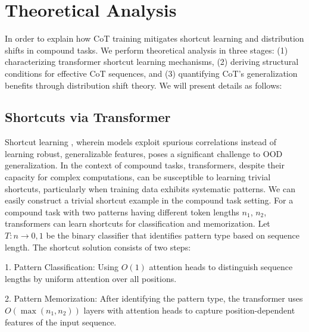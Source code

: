 \section{Theoretical Analysis}
In order to explain how CoT training mitigates shortcut learning and distribution shifts in compound tasks. We perform theoretical analysis in three stages: (1) characterizing transformer shortcut learning mechanisms, (2) deriving structural conditions for effective CoT sequences, and (3) quantifying CoT's generalization benefits through distribution shift theory. We will present details as follows:


\subsection{Shortcuts via Transformer}
Shortcut learning \cite{geirhos2020shortcut,robinson2021can}, wherein models exploit spurious correlations instead of learning robust, generalizable features, poses a significant challenge to OOD generalization. In the context of compound tasks, transformers, despite their capacity for complex computations, can be susceptible to learning trivial shortcuts, particularly when training data exhibits systematic patterns. We can easily construct a trivial shortcut example in the compound task setting.
\newline
For a compound task with two patterns having different token lengths $n_1$, $n_2$, transformers can learn shortcuts for classification and memorization. Let $T: n \to {0,1}$ be the binary classifier that identifies pattern type based on sequence length.
The shortcut solution consists of two steps:

1.  Pattern Classification: Using $O(1)$ attention heads to distinguish sequence lengths by uniform attention over all positions.


2.  Pattern Memorization: After identifying the pattern type, the transformer uses $O(\max(n_1, n_2))$ layers with attention heads to capture position-dependent features of the input sequence.

